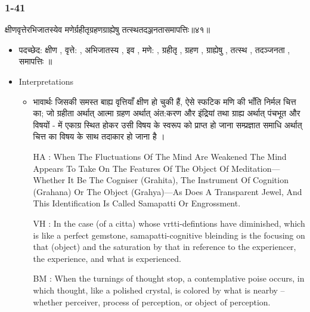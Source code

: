 \begin{frame}[fragile]\frametitle{1-41}
\begin{sanskrit}
क्षीणवृत्तेरभिजातस्येव मणेर्ग्रहीतृग्रहणग्राह्येषु तत्स्थतदञ्जनतासमापत्तिः॥४१॥
\end{sanskrit}

	\begin{itemize}
	\item पदच्छेद: क्षीण , वृत्ते: , अभिजातस्य , इव , मणे: , ग्रहीतृ , ग्रहण , ग्राह्येषु , तत्स्थ , तदञ्जनता , समापत्तिः ॥
	\item Interpretations
		\begin{itemize}	
		\item भावार्थः जिसकी समस्त बाह्य वृत्तियाँ क्षीण हो चुकी हैं, ऐसे स्फटिक मणि की भाँति निर्मल चित्त का; जो ग्रहीता अर्थात् आत्मा ग्रहण अर्थात् अंत:करण और इंद्रियां तथा ग्राह्य अर्थात् पंचभूत और विषयों - में एकाग्र स्थित होकर उसी विषय के स्वरूप को प्राप्त हो जाना सम्प्रज्ञात समाधि अर्थात् चित्त का विषय के साथ तदाकार हो जाना है ।		
		\item [HA]: When The Fluctuations Of The Mind Are Weakened The Mind Appears To Take On The Features Of The Object Of Meditation—Whether It Be The Cogniser (Grahita), The Instrument Of Cognition (Grahana) Or The Object (Grahya)—As Does A Transparent Jewel, And This Identification Is Called Samapatti Or Engrossment.
		\item [VH]: In the case (of a citta) whose vrtti-defintions have diminished, which is like a perfect gemstone, samapatti-cognitive bleinding is the focusing on that (object) and the saturation by that in reference to the experiencer, the experience, and what is experienced.
		\item [BM]: When the turnings of thought stop, a contemplative poise occurs, in which thought, like a polished crystal, is colored by what is nearby – whether perceiver, process of perception, or object of perception.
		\end{itemize}
	\end{itemize}
	
\end{frame}

